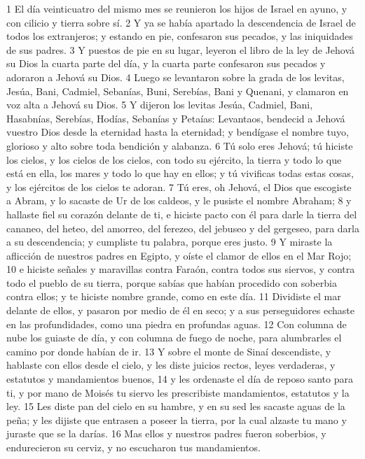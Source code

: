 1 El día veinticuatro del mismo mes se reunieron los hijos de Israel en ayuno, y con cilicio y tierra sobre sí.
2 Y ya se había apartado la descendencia de Israel de todos los extranjeros; y estando en pie, confesaron sus pecados, y las iniquidades de sus padres.
3 Y puestos de pie en su lugar, leyeron el libro de la ley de Jehová su Dios la cuarta parte del día, y la cuarta parte confesaron sus pecados y adoraron a Jehová su Dios.
4 Luego se levantaron sobre la grada de los levitas, Jesúa, Bani, Cadmiel, Sebanías, Buni, Serebías, Bani y Quenani, y clamaron en voz alta a Jehová su Dios.
5 Y dijeron los levitas Jesúa, Cadmiel, Bani, Hasabnías, Serebías, Hodías, Sebanías y Petaías: Levantaos, bendecid a Jehová vuestro Dios desde la eternidad hasta la eternidad; y bendígase el nombre tuyo, glorioso y alto sobre toda bendición y alabanza.
6 Tú solo eres Jehová; tú hiciste los cielos, y los cielos de los cielos, con todo su ejército, la tierra y todo lo que está en ella, los mares y todo lo que hay en ellos; y tú vivificas todas estas cosas, y los ejércitos de los cielos te adoran.
7 Tú eres, oh Jehová, el Dios que escogiste a Abram, y lo sacaste de Ur de los caldeos, y le pusiste el nombre Abraham; 
8 y hallaste fiel su corazón delante de ti, e hiciste pacto con él para darle la tierra del cananeo, del heteo, del amorreo, del ferezeo, del jebuseo y del gergeseo, para darla a su descendencia; y cumpliste tu palabra, porque eres justo.
9 Y miraste la aflicción de nuestros padres en Egipto, y oíste el clamor de ellos en el Mar Rojo; 
10 e hiciste señales y maravillas contra Faraón, contra todos sus siervos, y contra todo el pueblo de su tierra, porque sabías que habían procedido con soberbia contra ellos; y te hiciste nombre grande, como en este día.
11 Dividiste el mar delante de ellos, y pasaron por medio de él en seco; y a sus perseguidores echaste en las profundidades, como una piedra en profundas aguas. 
12 Con columna de nube los guiaste de día, y con columna de fuego de noche, para alumbrarles el camino por donde habían de ir. 
13 Y sobre el monte de Sinaí descendiste, y hablaste con ellos desde el cielo, y les diste juicios rectos, leyes verdaderas, y estatutos y mandamientos buenos,
14 y les ordenaste el día de reposo santo para ti, y por mano de Moisés tu siervo les prescribiste mandamientos, estatutos y la ley. 
15 Les diste pan del cielo en su hambre, y en su sed les sacaste aguas de la peña; y les dijiste que entrasen a poseer la tierra, por la cual alzaste tu mano y juraste que se la darías. 
16 Mas ellos y nuestros padres fueron soberbios, y endurecieron su cerviz, y no escucharon tus mandamientos.
